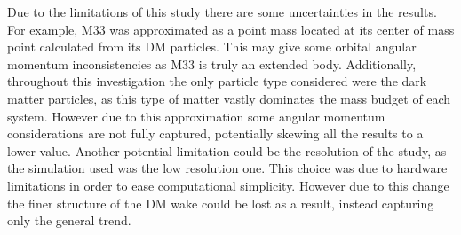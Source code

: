 \documentclass[fleqn,usenatbib]{mnras}
\begin{document}
\vspace{10pt}

Due to the limitations of this study there are some uncertainties in the results. For example, M33 was approximated as a point mass located at its center of mass point calculated from its DM particles. This may give some orbital angular momentum inconsistencies as M33 is truly an extended body. Additionally, throughout this investigation the only particle type considered were the dark matter particles, as this type of matter vastly dominates the mass budget of each system. However due to this approximation some angular momentum considerations are not fully captured, potentially skewing all the results to a lower value. Another potential limitation could be the resolution of the study, as the simulation used was the low resolution one. This choice was due to hardware limitations in order to ease computational simplicity. However due to this change the finer structure of the DM wake could be lost as a result, instead capturing only the general trend.  

















\bsp	%
\label{lastpage}
\end{document}
